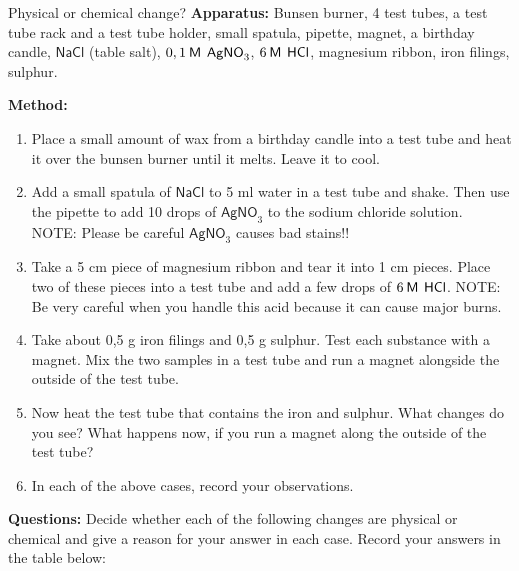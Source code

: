             \begin{Investigation}{Physical or chemical change? }
            \nopagebreak
        \label{m38709*id63636}\noindent{}\textbf{Apparatus:}
Bunsen burner, 4 test tubes, a test tube rack and a test tube holder, small spatula, pipette, magnet, a birthday candle, $\mathsf{NaCl}$ (table salt), $0,1\phantom{\rule{2pt}{0ex}}\mathsf{M}\phantom{\rule{4pt}{0ex}}{\mathsf{AgNO}}_{3}$, $6\phantom{\rule{2pt}{0ex}}\mathsf{M}\phantom{\rule{4pt}{0ex}}\mathsf{HCl}$, magnesium ribbon, iron filings, sulphur.\par 
        \label{m38709*eip-118}
	\par
      \label{m38709*id62113}\noindent{}\textbf{Method:}
        \label{m38709*id62119}\begin{enumerate}[noitemsep, label=\textbf{\arabic*}. ] 
            \label{m38709*uid27}\item Place a small amount of wax from a birthday candle into a test tube and heat it over the bunsen burner until it melts. Leave it to cool.
\label{m38709*uid28}\item Add a small spatula of $\mathsf{NaCl}$ to 5 ml water in a test tube and shake. Then use the pipette to add 10 drops of ${\mathsf{AgNO}}_{3}$ to the sodium chloride solution. NOTE: Please be careful ${\mathsf{AgNO}}_{3}$ causes bad stains!!
\label{m38709*uid29}\item Take a 5 cm piece of magnesium ribbon and tear it into 1 cm pieces. Place two of these pieces into a test tube and add a few drops of $6\phantom{\rule{2pt}{0ex}}\mathsf{M}\phantom{\rule{4pt}{0ex}}\mathsf{HCl}$. NOTE: Be very careful when you handle this acid because it can cause major burns.
\label{m38709*uid30}\item Take about 0,5 g iron filings and 0,5 g sulphur. Test each substance with a magnet. Mix the two samples in a test tube and run a magnet alongside the outside of the test tube.
\label{m38709*uid31}\item Now heat the test tube that contains the iron and sulphur. What changes do you see? What happens now, if you run a magnet along the outside of the test tube?
\label{m38709*uid32}\item In each of the above cases, record your observations.
\end{enumerate}
        \par 
        \label{m38709*id63979}\noindent{}\textbf{Questions:}
Decide whether each of the following changes are physical or chemical and give a reason for your answer in each case. Record your answers in the table below:

\end{Investigation}
